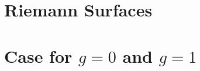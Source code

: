 \documentclass[a4paper, 8pt, notitlepage]{extreport}
\begin{document}
    

    \chapter{Riemann Surfaces}
    
    
    

    \chapter{Case for $g=0$ and $g=1$}

    \printbibliography
\end{document}
